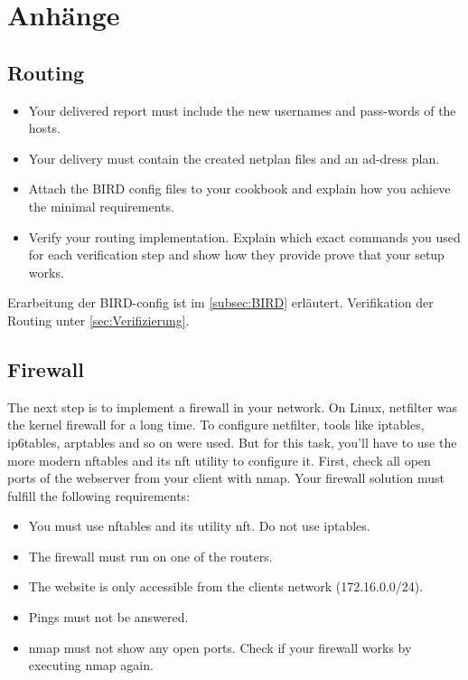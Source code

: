 \documentclass[11pt,titlepage]{article}
\newenvironment{shadedquotation}
 {\begin{shaded*}
  \quoting[leftmargin=0pt, vskip=0pt]
 }
 {\endquoting
 \end{shaded*}
}
\begin{document}
\section{Anhänge}
\label{sec:Anhänge}

\subsection{Routing}
\label{subsec:Routing}
\begin{shadedquotation}
  \begin{itemize}
    \item Your delivered report must include the new usernames and pass-words of the hosts.
    \item Your delivery must contain the created netplan files and an ad-dress plan.
    \item Attach the BIRD config files to your cookbook and explain how you achieve the minimal requirements.
    \item Verify your routing implementation. Explain which exact commands you used for each verification step and show how they provide prove that your setup works.
  \end{itemize}
\end{shadedquotation}
Erarbeitung der BIRD-config ist im \ref{subsec:BIRD} erläutert.
Verifikation der Routing unter \ref{sec:Verifizierung}.

\subsection{Firewall}
\label{subsec:Firewall}
\begin{shadedquotation}
	The next step is to implement a firewall in your network. On Linux, netfilter was the kernel
	firewall for a long time. To configure netfilter, tools like iptables, ip6tables, arptables and so
	on were used. But for this task, you’ll have to use the more modern nftables and its nft utility
	to configure it.
	First, check all open ports of the webserver from your client with nmap. Your firewall solution
	must fulfill the following requirements:
	\begin{itemize}
		\item You must use nftables and its utility nft. Do not use iptables.
		\item The firewall must run on one of the routers.
		\item The website is only accessible from the clients network (172.16.0.0/24).
		\item Pings must not be answered.
		\item nmap must not show any open ports. Check if your firewall works by executing nmap again.
	\end{itemize}
\end{shadedquotation}
\end{document}

